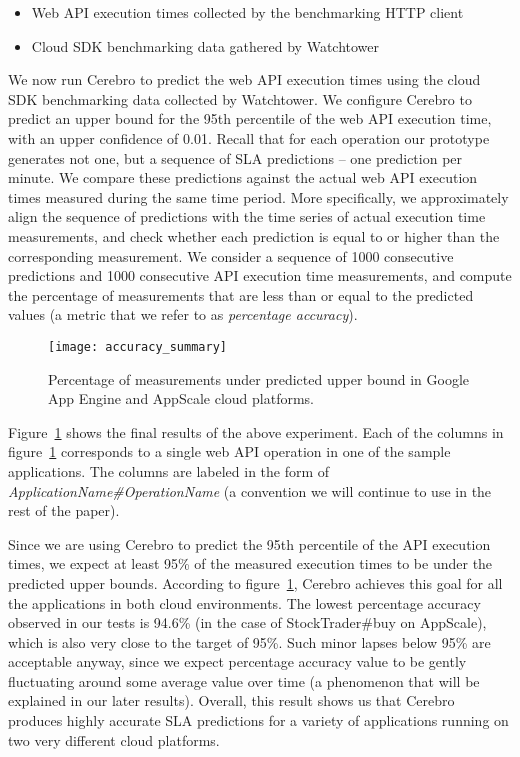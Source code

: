 \begin{itemize}
\item Web API execution times collected by the benchmarking HTTP client
\item Cloud SDK benchmarking data gathered by Watchtower
\end{itemize}

We now run Cerebro to predict the web API execution times using the cloud SDK benchmarking data
collected by Watchtower. We configure Cerebro to predict an upper bound for the 95th percentile of the web API
execution time, with an upper confidence of 0.01. Recall that for each operation our prototype generates not one, 
but a sequence of SLA predictions -- one prediction per minute. 
We compare these predictions against the actual web API execution times measured during the same
time period. More specifically, we approximately align the sequence of predictions with the time series of actual execution
time measurements, and check whether each prediction is equal to or higher than the corresponding measurement. We consider a 
sequence of 1000 consecutive predictions and 1000 consecutive API execution
time measurements, and compute the percentage of measurements that are less than or equal to the predicted values (a
metric that we refer to as \textit{percentage accuracy}).

\begin{figure}
\centering
\texttt{[image: accuracy\_summary]}
\caption{Percentage of measurements under predicted upper bound in Google App Engine and AppScale cloud platforms.}
\label{fig:accuracy_summary}
\end{figure}

Figure~\ref{fig:accuracy_summary} shows the final results of the above experiment.
Each of the columns in figure~\ref{fig:accuracy_summary} corresponds to a single web API operation in 
one of the sample applications. The columns are labeled in the form of \textit{ApplicationName\#OperationName} (a convention 
we will continue to use in the rest of the paper). %

Since we are using Cerebro to predict the 95th percentile of the API execution times, we expect at least 95\% of the measured execution
times to be under the predicted upper bounds. According to figure~\ref{fig:accuracy_summary}, Cerebro achieves this goal for all
the applications in both cloud environments. The lowest percentage accuracy observed
in our tests is 94.6\% (in the case of StockTrader\#buy on AppScale), which is also very close to the target of 95\%. Such minor
lapses below 95\% are acceptable anyway, since we expect percentage accuracy value to be gently fluctuating around some
average value over time (a phenomenon that will be explained in our later results). Overall, this result shows us that
Cerebro produces highly accurate SLA predictions for a variety of applications running on two very
different cloud platforms.


